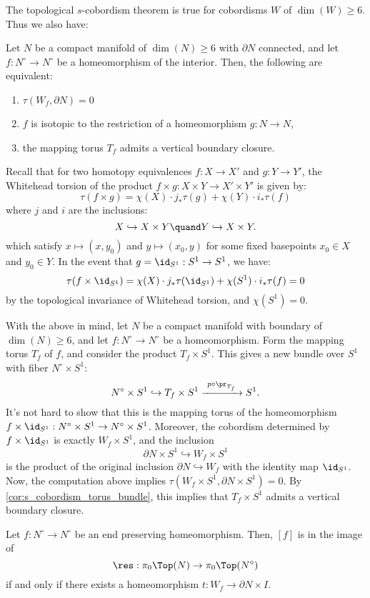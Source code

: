 The topological $s$-cobordism theorem is true for cobordisms $W$ of $\dim(W)\geq 6$. Thus we also have:
\begin{cor}\label{cor:s_cobordism_torus_bundle}
Let $N$ be a compact manifold of $\dim(N)\geq 6$ with $\partial{N}$ connected, and let $f:N^{\circ}\to N^{\circ}$ be a homeomorphism of the interior. Then, the following are equivalent:
\begin{enumerate}
    \item $\tau(W_f,\partial{N})=0$
    \item $f$ is isotopic to the restriction of a homeomorphism $g:N\to N$,    
    \item the mapping torus $T_f$ admits a vertical boundary closure.
\end{enumerate}
\end{cor}

Recall that for two homotopy equivalences $f:X\to X'$ and $g:Y\to Y'$, the Whitehead torsion of the product $f\times g:X\times Y\to X'\times Y'$ is given by:
\[
    \tau(f\times g) = \chi(X)\cdot j_*\tau(g) + \chi(Y)\cdot i_*\tau(f) 
\]
where $j$ and $i$ are the inclusions:
\[
    X\hookrightarrow X\times Y\quand Y\hookrightarrow X\times Y.
\]
which satisfy $x\mapsto (x,y_0)$ and $y\mapsto (x_0,y)$ for some fixed basepoints $x_0\in X$ and $y_0\in Y$. In the event that $g = \id_{S^1}:S^1\to S^1$, we have:
\[
    \tau(f\times\id_{S^1}) = \chi(X)\cdot j_*\tau(\id_{S^1}) + \chi(S^1)\cdot i_*\tau(f) = 0
\]
by the topological invariance of Whitehead torsion, and $\chi(S^1)=0$. 

With the above in mind, let $N$ be a compact manifold with boundary of $\dim(N)\geq 6$, and let $f:N^{\circ}\to N^{\circ}$ be a homeomorphism. Form the mapping torus $T_f$ of $f$, and consider the product $T_f\times S^1$. This gives a new bundle over $S^1$ with fiber $N^{\circ}\times S^1$:
\[
    N^{\circ}\times S^1\hookrightarrow T_f\times S^1\xrightarrow{\ p\circ\pr_{T_f} \ }S^1.
\]
It's not hard to show that this is the mapping torus of the homeomorphism $f\times\id_{S^1}:N^{\circ}\times S^1\to N^{\circ}\times S^1$. Moreover, the cobordism determined by $f\times\id_{S^1}$ is exactly $W_f\times S^1$, and the inclusion 
\[
    \partial{N}\times S^1\hookrightarrow W_f\times S^1
\]
is the product of the original inclusion $\partial{N}\hookrightarrow W_f$ with the identity map $\id_{S^1}$. Now, the computation above implies $\tau(W_f\times S^1,\partial{N}\times S^1)=0$. By \cref{cor:s_cobordism_torus_bundle}, this implies that $T_f\times S^1$ admits a vertical boundary closure.

\begin{prop}
Let $f:N^{\circ}\to N^{\circ}$ be an end preserving homeomorphism. Then, $[f]$ is in the image of
    \[
        \res:\pi_0\Top(N)\to\pi_0\Top(N^{\circ})
    \]
    if and only if there exists a homeomorphism $t:W_f\to\partial{N}\times I$.
\end{prop}